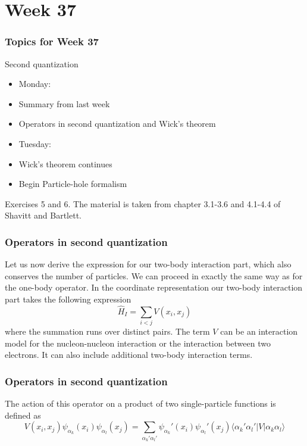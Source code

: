 \documentclass[compress]{beamer}
\newcommand*{\ket}[1]{|#1\rangle}
\newcommand*{\bra}[1]{\langle#1|}
\newcommand{\element}[3]
        {\bra{#1}#2\ket{#3}}
\begin{document}
\section[Week 37]{Week 37}
\frame
{
  \frametitle{Topics for Week 37}
  \begin{block}{Second quantization}
\begin{itemize}
\item Monday:
\item Summary from last week
\item Operators in second quantization and Wick's theorem
\item Tuesday:
\item Wick's theorem continues
\item Begin Particle-hole formalism
\end{itemize}
Exercises 5 and 6. 
The material is taken from chapter 3.1-3.6 and 4.1-4.4 of Shavitt and Bartlett.
  \end{block}
} 


\frame
{
  \frametitle{Operators in second quantization}
\begin{small}
{\scriptsize
Let us now derive the expression for our two-body interaction part, which also conserves the number of particles.
We can proceed in exactly the same way as for the one-body operator. In the coordinate representation our
two-body interaction part takes the following expression
\begin{equation}
	\hat{H}_I = \sum_{i<j} V(x_i,x_j) \label{eq:2-31}
\end{equation}
where the summation runs over distinct pairs. The term $V$ can be an interaction model for the nucleon-nucleon interaction
or the interaction between two electrons. It can also include additional two-body interaction terms. 
}
\end{small}
}


\frame
{
  \frametitle{Operators in second quantization}
\begin{small}
{\scriptsize
The action of this operator on a product of 
two single-particle functions is defined as 
\begin{equation}
	V(x_i,x_j) \psi_{\alpha_k}(x_i) \psi_{\alpha_l}(x_j) = \sum_{\alpha_k'\alpha_l'} 
		\psi_{\alpha_k}'(x_i)\psi_{\alpha_l}'(x_j) 
		\element{\alpha_k'\alpha_l'}{V}{\alpha_k\alpha_l} \label{eq:2-32}
\end{equation}
}
\end{small}
}
\end{document}
